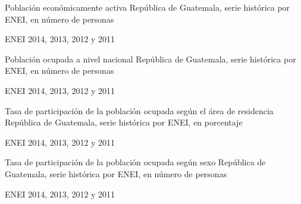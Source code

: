  
 
 {%
 }%
 {%
 	Población económicamente activa} %
 {%
 	República de Guatemala, serie histórica por ENEI, en número de personas} %
 {%
 	\begin{tikzpicture}[x=1pt,y=1pt]    \end{tikzpicture}}%
 {%
 	ENEI 2014, 2013, 2012 y 2011} %
 
 
  
  {%
  }%
  {%
  	Población ocupada a nivel nacional} %
  {%
  	República de Guatemala, serie histórica por ENEI, en número de personas} %
  {%
  	\begin{tikzpicture}[x=1pt,y=1pt]    \end{tikzpicture}}%
  {%
  	ENEI 2014, 2013, 2012 y 2011} %
  
  
  
  
  {%
  }%
  {%
  	Tasa de participación de la población ocupada según el área de residencia} %
  {%
  	República de Guatemala, serie histórica por ENEI, en porcentaje} %
  {%
  	\begin{tikzpicture}[x=1pt,y=1pt]    \end{tikzpicture}}%
  {%
  	ENEI 2014, 2013, 2012 y 2011} %
  
  
 
 {%
 }%
 {%
 	Tasa de participación de la población ocupada según sexo} %
 {%
 	República de Guatemala, serie histórica por ENEI, en número de personas} %
 {%
 	\begin{tikzpicture}[x=1pt,y=1pt]    \end{tikzpicture}}%
 {%
 	ENEI 2014, 2013, 2012 y 2011} %
 
